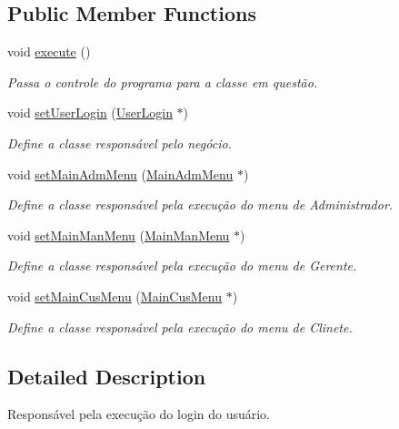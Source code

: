 \subsection*{Public Member Functions}
\begin{DoxyCompactItemize}
\item 
void \hyperlink{classMainLogin_ab0149573d015f41f401cfb28aea35509}{execute} ()
\begin{DoxyCompactList}\small\item\em Passa o controle do programa para a classe em questão. \end{DoxyCompactList}\item 
void \hyperlink{classMainLogin_a286c0703647c7c252093bf7589f63c64}{set\-User\-Login} (\hyperlink{classUserLogin}{User\-Login} $\ast$)
\begin{DoxyCompactList}\small\item\em Define a classe responsável pelo negócio. \end{DoxyCompactList}\item 
void \hyperlink{classMainLogin_a0161cf5b7b4d5d829292a38e4059abb5}{set\-Main\-Adm\-Menu} (\hyperlink{classMainAdmMenu}{Main\-Adm\-Menu} $\ast$)
\begin{DoxyCompactList}\small\item\em Define a classe responsável pela execução do menu de Administrador. \end{DoxyCompactList}\item 
void \hyperlink{classMainLogin_a4561c5838a48ad8436cd8d0b1749511a}{set\-Main\-Man\-Menu} (\hyperlink{classMainManMenu}{Main\-Man\-Menu} $\ast$)
\begin{DoxyCompactList}\small\item\em Define a classe responsável pela execução do menu de Gerente. \end{DoxyCompactList}\item 
void \hyperlink{classMainLogin_a2302b88c01b0ea4b29e4a824c5b7f185}{set\-Main\-Cus\-Menu} (\hyperlink{classMainCusMenu}{Main\-Cus\-Menu} $\ast$)
\begin{DoxyCompactList}\small\item\em Define a classe responsável pela execução do menu de Clinete. \end{DoxyCompactList}\end{DoxyCompactItemize}


\subsection{Detailed Description}
Responsável pela execução do login do usuário. 



